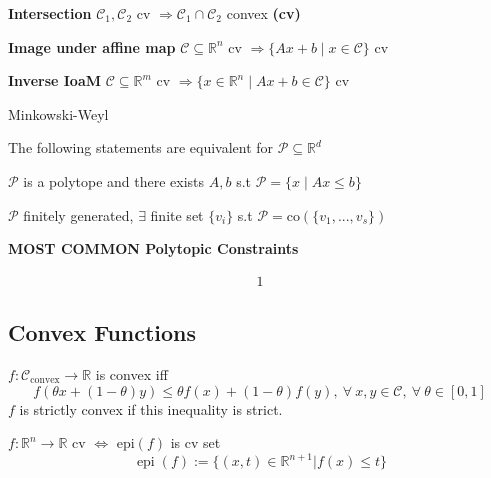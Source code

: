 \textbf{Intersection}
$\mathcal{C}_1, \mathcal{C}_2$ cv
$\Rightarrow \mathcal{C}_1 \cap \mathcal{C}_2$ convex \textbf{(cv)}

\textbf{Image under affine map}
$\mathcal{C} \subseteq  \mathbb{R}^{n}$ cv
$\Rightarrow \{Ax+b \mid x \in \mathcal{C} \}$ cv

\textbf{Inverse IoaM}
$\mathcal{C} \subseteq  \mathbb{R}^{m}$ cv
$\Rightarrow \{x\in\mathbb{R}^{n} \mid  Ax+b\in\mathcal{C}\}$ cv

\begin{theorem}{Minkowski-Weyl}

	The following statements are equivalent
	for $\mathcal{P}\subseteq \mathbb{R}^d$

	$\mathcal{P}$ is a polytope and there exists
	$A, b$ s.t $\mathcal{P} = \{x \mid Ax \leq b\}$

	$\mathcal{P}$ finitely generated,
	$\exists$ finite set $\{v_i\}$ s.t
	$\mathcal{P}=\text{co}(\{v_1,...,v_s\})$
\end{theorem}


\begin{sstTitleBox}[Apricot]{\textbf{\large
			MOST COMMON Polytopic Constraints
		}
	}


	\[\begin{aligned}
			1
		\end{aligned}\]

\end{sstTitleBox}

\subsection{Convex Functions}

\begin{definition}
	$f: \mathcal{C}_\text{convex} \to\mathbb{R}$ is convex iff
	\[
		f(\theta x + (1-\theta)y)\le \theta f(x)+ (1-\theta)f(y),
		\ \forall\ x,y \in \mathcal{C},
		\ \forall\ \theta \in [0,1]\]
	$f$ is strictly convex if this inequality is strict.
\end{definition}


\begin{definition}[Epigraph]
	$f:\mathbb{R}^n \rightarrow \mathbb{R}$ cv
	$\Leftrightarrow$
	epi$(f)$ is cv set
	$$\operatorname{epi}(f):=\{(x,t)\in \mathbb{R}^{n+1} | f(x)\le t\}$$
\end{definition}

